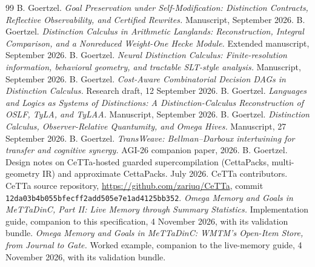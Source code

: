 \documentclass[11pt]{article}
\newcommand{\code}[1]{\texttt{#1}}
\theoremstyle{definition}
\theoremstyle{plain}
\begin{document}
\begin{thebibliography}{99}
 B. Goertzel. \emph{Goal Preservation under Self-Modification: Distinction Contracts, Reflective Observability, and Certified Rewrites.} Manuscript, September 2026.
 B. Goertzel. \emph{Distinction Calculus in Arithmetic Langlands: Reconstruction, Integral Comparison, and a Nonreduced Weight-One Hecke Module.} Extended manuscript, September 2026.
 B. Goertzel. \emph{Neural Distinction Calculus: Finite-resolution information, behavioral geometry, and tractable SLT-style analysis.} Manuscript, September 2026.
 B. Goertzel. \emph{Cost-Aware Combinatorial Decision DAGs in Distinction Calculus.} Research draft, 12 September 2026.
 B. Goertzel. \emph{Languages and Logics as Systems of Distinctions: A Distinction-Calculus Reconstruction of OSLF, TyLA, and TyLAA.} Manuscript, September 2026.
 B. Goertzel. \emph{Distinction Calculus, Observer-Relative Quantumity, and Omega Hives.} Manuscript, 27 September 2026.
 B. Goertzel. \emph{TransWeave: Bellman--Darboux intertwining for transfer and cognitive synergy.} AGI-26 companion paper, 2026.
 B. Goertzel. Design notes on CeTTa-hosted guarded supercompilation (CettaPacks, multi-geometry IR) and approximate CettaPacks. July 2026.
 CeTTa contributors. CeTTa source repository, \url{https://github.com/zariuq/CeTTa}, commit \code{12da03b4b055bfecff2add505e7e1ad4125bb352}.
 \emph{Omega Memory and Goals in MeTTaDinC, Part II: Live Memory through Summary Statistics.} Implementation guide, companion to this specification, 4 November 2026, with its validation bundle.
 \emph{Omega Memory and Goals in MeTTaDinC: WMTM's Open-Item Store, from Journal to Gate.} Worked example, companion to the live-memory guide, 4 November 2026, with its validation bundle.


\end{thebibliography}
\end{document}
